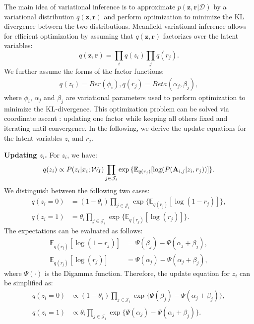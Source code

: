The main idea of variational inference \cite{tzikas2008variational} is to approximate $p(\mathbf{z},\mathbf{r} | \mathcal{D})$ by a variational distribution $q(\mathbf{z},\mathbf{r})$ and perform optimization to minimize the KL divergence between the two distributions. Meanfield variational inference allows for efficient optimization by assuming that $q(\mathbf{z},\mathbf{r})$ factorizes over the latent variables:
\begin{equation}
    q(\mathbf{z},\mathbf{r})=\prod_{i} q(z_i) \prod_j q(r_j).
    \label{eq:dist_fact}
\end{equation}
%
We further assume the forms of the factor functions:
\begin{align}
    q(z_i)=Ber(\phi_i), q(r_j)=Beta(\alpha_j,\beta_j),
\end{align}
%
where $\phi_i$, $\alpha_j$ and $\beta_j$ are variational parameters used to perform optimization to minimize the KL-divergence. This optimization problem can be solved via coordinate ascent \cite{blei2017variational}: updating one factor while keeping all others fixed and iterating until convergence. In the following, we derive the update equations for the latent variables $z_i$ and $r_j$.

\smallskip
\noindent\textbf{Updating $z_i$.} For $z_i$, we have:
%
\begin{equation}
q(z_i)    \propto P(z_i|x_i; \mathcal{W}_I) \prod_{j \in \mathcal{J}_{i}} \exp{\{\mathbb{E}_{q(r_j)}[\log (P(\mathbf{A}_{i,j}|z_i,r_j))]\}} . \\
\end{equation}
%
We distinguish between the following two cases:
%
\begin{align}
  q(z_i=0)   &= (1-\theta_i) \prod_{j \in \mathcal{J}_{i}} \exp{\{\mathbb{E}_{q(r_j)}[\log (1-r_j)]\}} \nonumber, \\
  q(z_i=1)   &= \theta_i \prod_{j \in \mathcal{J}_{i}} \exp{\{\mathbb{E}_{q(r_j)}[\log (r_j)]\}}  .
\label{eq:q_two_poss}                
\end{align}
%
The expectations can be evaluated as follows:
\begin{align}
    \mathbb{E}_{q(r_j)}[\log (1-r_j)]&= \Psi(\beta_j)-\Psi(\alpha_j+\beta_j), \nonumber \\
    \mathbb{E}_{q(r_j)}[\log (r_j)]&= \Psi(\alpha_j)-\Psi(\alpha_j+\beta_j),
    \label{eq:expect}
\end{align}
where $\Psi(\cdot)$ is the Digamma function. Therefore, the update equation for $z_i$ can be simplified as:
\begin{align}
    q(z_i=0)   &  \propto (1-\theta_i) \prod_{j \in \mathcal{J}_{i}} \exp{\{\Psi(\beta_j)-\Psi(\alpha_j+\beta_j)\}}, \nonumber \\  
     q(z_i=1)    &  \propto \theta_i \prod_{j \in \mathcal{J}_{i}} \exp{\{ \Psi(\alpha_j)-\Psi(\alpha_j+\beta_j)\}} .
     \label{eq:qzi}
\end{align}

